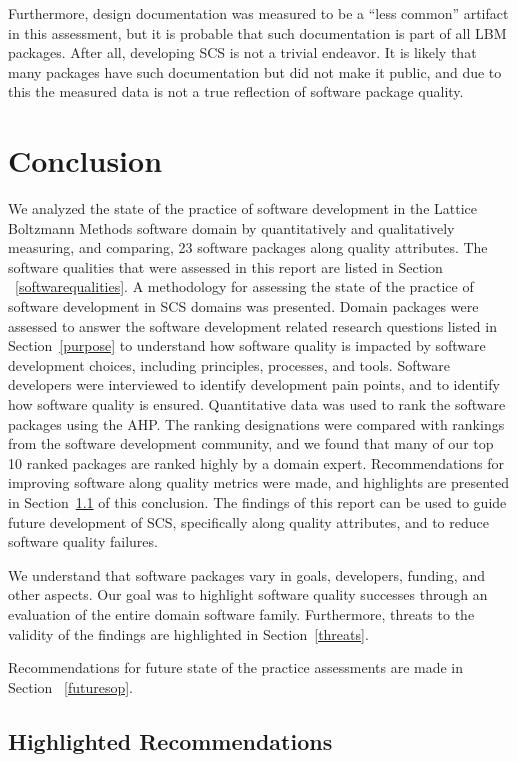 \documentclass[final, 3p, times, authoryear]{elsarticle}
\begin{document}
Furthermore, design documentation was measured to be a ``less common'' artifact
in this assessment, but it is probable that such documentation is part of all
LBM packages. After all, developing SCS is not a trivial endeavor. It is likely
that many packages have such documentation but did not make it public, and due
to this the measured data is not a true reflection of software package quality.

\section{Conclusion} \label{conclusion}

We analyzed the state of the practice of software development in the Lattice
Boltzmann Methods software domain by quantitatively and qualitatively measuring,
and comparing, 23 software packages along quality attributes. The software
qualities that were assessed in this report are listed in Section
~\ref{softwarequalities}. A methodology for assessing the state of the practice
of software development in SCS domains was presented. Domain packages were
assessed to answer the software development related research questions listed in
Section~\ref{purpose} to understand how software quality is impacted by software
development choices, including principles, processes, and tools. Software
developers were interviewed to identify development pain points, and to identify
how software quality is ensured. Quantitative data was used to rank the software
packages using the AHP. The ranking designations were compared with rankings
from the software development community, and we found that many of our top 10
ranked packages are ranked highly by a domain expert. Recommendations for
improving software along quality metrics were made, and highlights are presented
in Section~\ref{highlightedrecommendations} of this conclusion. The findings of
this report can be used to guide future development of SCS, specifically along
quality attributes, and to reduce software quality failures.

We understand that software packages vary in goals, developers, funding, and
other aspects. Our goal was to highlight software quality successes through an
evaluation of the entire domain software family. Furthermore, threats to the
validity of the findings are highlighted in Section~\ref{threats}. 

Recommendations for future state of the practice assessments are made in Section
~\ref{futuresop}.

\subsection{Highlighted Recommendations} \label{highlightedrecommendations}
\end{document}
